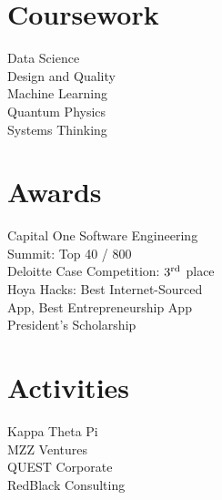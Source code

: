 \documentclass[]{deedy-resume}
\begin{document}
\begin{minipage}[t][.7\textheight][t]{0.33\textwidth}

\section{Coursework}
Data Science \\
Design and Quality \\
Machine Learning \\
Quantum Physics \\
Systems Thinking \\
\sectionsep %


\section{Awards}
Capital One Software Engineering \\
\hspace{4pt} Summit: Top 40 / 800 \\
Deloitte Case Competition: \( 3\textsuperscript{rd} \) place \\
Hoya Hacks: Best Internet-Sourced \\
\hspace{4pt} App, Best Entrepreneurship App \\
President's Scholarship \\
\sectionsep %

\section{Activities}
Kappa Theta Pi \\
MZZ Ventures \\
QUEST Corporate \\
RedBlack Consulting \\
\sectionsep %
%
%

\end{minipage} 
\hfill
\end{document}
